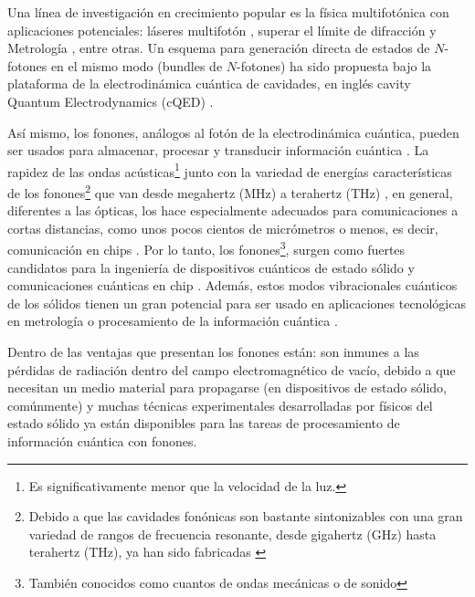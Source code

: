 \documentclass[main.tex]{subfiles}
\begin{document}
Una línea de investigación en crecimiento popular es la física multifotónica \parencite{Kubanek2008, Ota2011} con aplicaciones potenciales: láseres multifotón \parencite{Gauthier1992}, superar el límite de difracción \parencite{DAngelo2001} y Metrología \parencite{Afek2010}, entre otras. Un esquema para generación directa de estados de $N$-fotones en el mismo modo (bundles de $N$-fotones) ha sido propuesta bajo la plataforma de la electrodinámica cuántica de cavidades, en inglés cavity Quantum Electrodynamics (cQED) \parencite{Muñoz2014}.

Así mismo, los fonones, análogos al fotón de la electrodinámica cuántica, pueden ser usados para almacenar, procesar y transducir información cuántica \parencite{Vargas2022}. La rapidez de las ondas acústicas\footnote{Es significativamente menor que la velocidad de la luz.} junto con la variedad de energías características de los fonones\footnote{Debido a que las cavidades fonónicas son bastante sintonizables con una gran variedad de rangos de frecuencia resonante, desde gigahertz (GHz) hasta terahertz (THz), ya han sido fabricadas \parencite{Borri2001} } que van desde megahertz (MHz) a terahertz (THz) \parencite{Wigger2021, Kettler2021}, en general, diferentes a las ópticas, los hace especialmente adecuados para comunicaciones a cortas distancias, como unos pocos cientos de micrómetros o menos, es decir, comunicación en chips \parencite{Gustafsson2014, Wan2021}. Por lo tanto, los fonones\footnote{También conocidos como cuantos de ondas mecánicas o de sonido}, surgen como fuertes candidatos para la ingeniería de dispositivos cuánticos de estado sólido y comunicaciones cuánticas en chip \parencite{Bin2020}. Además, estos modos vibracionales cuánticos de los sólidos tienen un gran potencial para ser usado en aplicaciones tecnológicas en metrología o procesamiento de la información cuántica \parencite{Zhang2018}.

Dentro de las ventajas que presentan los fonones están: son inmunes a las pérdidas de radiación dentro del campo electromagnético de vacío, debido a que necesitan un medio material para propagarse (en dispositivos de estado sólido, comúnmente) y muchas técnicas experimentales desarrolladas por físicos del estado sólido \parencite{Ask2019} ya están disponibles para las tareas de procesamiento de información cuántica con fonones.
\end{document}
